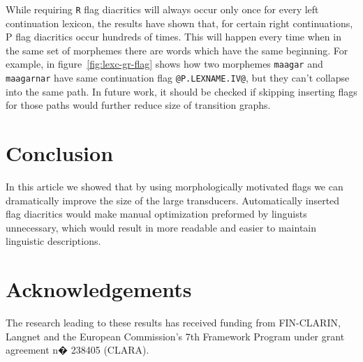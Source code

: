 \documentclass[10pt, a4paper]{article}
\begin{document}
While requiring {\tt R} flag diacritics will always occur only once
for every left continuation lexicon, the results have shown that, for
certain right continuations, P flag diacritics occur hundreds of
times. This will happen every time when in the same set of morphemes
there are words which have the same beginning. For example, in
figure~\ref{fig:lexc-gr-flag} shows how two morphemes \texttt{maagar}
and \texttt{maagarnar} have same continuation flag
\verb+@P.LEXNAME.IV@+, but they can't collapse into the same path. In future
work, it should be checked if skipping inserting flags for those paths would
further reduce size of transition graphs.




\section{Conclusion}
\label{sec:conclusion}

In this article we showed that by using morphologically motivated
flags we can dramatically improve the size of the large transducers.  Automatically
inserted flag diacritics would make manual optimization preformed by
linguists unnecessary, which would result in more readable and easier
to maintain linguistic descriptions.

\section{Acknowledgements}
The research leading to these results has received funding from FIN-CLARIN, Langnet and the
European Commission's 7th Framework Program under grant agreement n� 238405 (CLARA).



\end{document}
